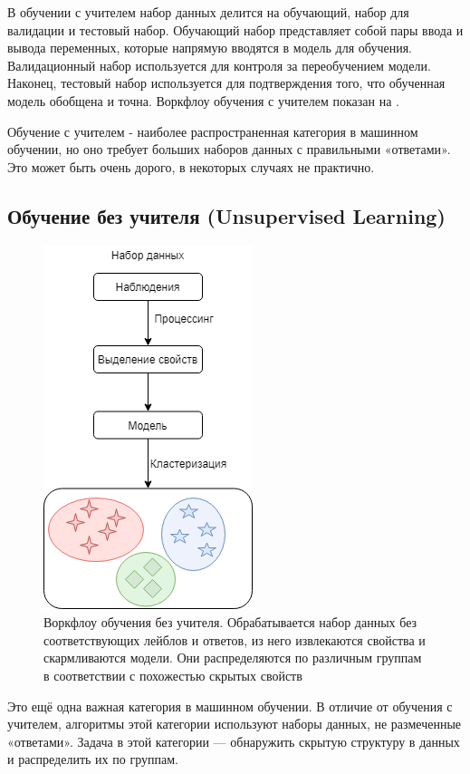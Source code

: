В обучении с учителем набор данных делится на обучающий, набор для валидации и тестовый набор. Обучающий набор представляет собой пары ввода и вывода переменных, которые напрямую вводятся в модель для обучения. Валидационный набор используется для контроля за переобучением модели. Наконец, тестовый набор используется для подтверждения того, что обученная модель обобщена и точна. Воркфлоу обучения с учителем показан на .

Обучение с учителем - наиболее распространенная категория в машинном обучении, но оно требует больших наборов данных с правильными «ответами». Это может быть очень дорого, в некоторых случаях не практично.


\subsection{Обучение без учителя (Unsupervised Learning)}

\begin{figure}[ht!]
	\center
	\includegraphics [scale=0.60] {my_folder/images/ch1/unsupervised-learning.png}
	\caption{Воркфлоу обучения без учителя. Обрабатывается набор данных без соответствующих лейблов и ответов, из него извлекаются свойства и скармливаются модели. Они распределяются по различным группам в соответствии с похожестью скрытых свойств}
	\label{fig:unsupervised-learning}
\end{figure}

Это ещё одна важная категория в машинном обучении.
В отличие от обучения с учителем, алгоритмы этой категории используют наборы данных, не размеченные «ответами». Задача в этой категории --- обнаружить скрытую структуру в данных и распределить их по группам.

